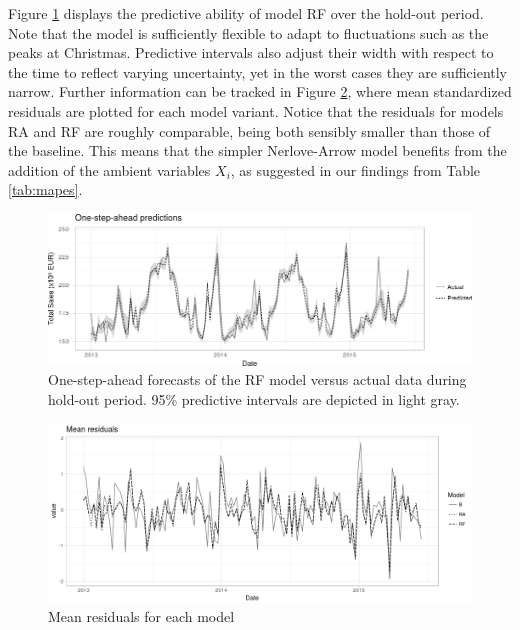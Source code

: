 

Figure \ref{fig:forecasts} displays the predictive ability of model RF over the hold-out period. Note that the model is sufficiently flexible to adapt to fluctuations such as the peaks at Christmas. Predictive intervals also adjust their width with respect to the time to reflect varying uncertainty, yet in the worst cases they are sufficiently narrow. Further information can be tracked in Figure \ref{fig:residuals}, where mean standardized residuals are plotted for each model variant. Notice that the residuals for models RA and RF are roughly comparable, being both sensibly smaller than those of the baseline. This means that the simpler Nerlove-Arrow model benefits from the addition of the ambient variables $X_i$, as suggested in our findings from Table \ref{tab:mapes}.
\begin{figure}[h]
\centering
\includegraphics[scale=0.55]{figures/forecasts.png}
\caption{One-step-ahead forecasts of the RF model versus actual data during hold-out period. 95\% predictive intervals are depicted in light gray.}\label{fig:forecasts}
\end{figure}



\begin{figure}[h]
\centering
\includegraphics[scale=0.6]{figures/resis.png}
\caption{Mean residuals for each model}\label{fig:residuals}
\end{figure}


